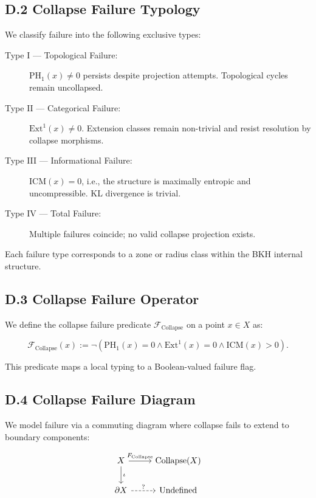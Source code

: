 \documentclass[11pt]{article}
\begin{document}
\subsection*{D.2 Collapse Failure Typology}

We classify failure into the following exclusive types:

\begin{description}
    \item[Type I — Topological Failure:] \( \mathrm{PH}_1(x) \not= 0 \) persists despite projection attempts. Topological cycles remain uncollapsed.
    \item[Type II — Categorical Failure:] \( \mathrm{Ext}^1(x) \not= 0 \). Extension classes remain non-trivial and resist resolution by collapse morphisms.
    \item[Type III — Informational Failure:] \( \mathrm{ICM}(x) = 0 \), i.e., the structure is maximally entropic and uncompressible. KL divergence is trivial.
    \item[Type IV — Total Failure:] Multiple failures coincide; no valid collapse projection exists.
\end{description}

Each failure type corresponds to a zone or radius class within the BKH internal structure.

\subsection*{D.3 Collapse Failure Operator}

We define the collapse failure predicate \( \mathcal{F}_{\mathrm{Collapse}} \) on a point \( x \in X \) as:

\[
\mathcal{F}_{\mathrm{Collapse}}(x) :=
\neg \left( \mathrm{PH}_1(x) = 0 \wedge \mathrm{Ext}^1(x) = 0 \wedge \mathrm{ICM}(x) > 0 \right).
\]

This predicate maps a local typing to a Boolean-valued failure flag.

\subsection*{D.4 Collapse Failure Diagram}

We model failure via a commuting diagram where collapse fails to extend to boundary components:

\[
\begin{tikzcd}
X \arrow[r, "F_{\mathrm{Collapse}}"] \arrow[d, "\iota"]
& \mathrm{Collapse}(X) \\
\partial X \arrow[r, dashed, "?"]
& \text{Undefined}
\end{tikzcd}
\]
\end{document}
